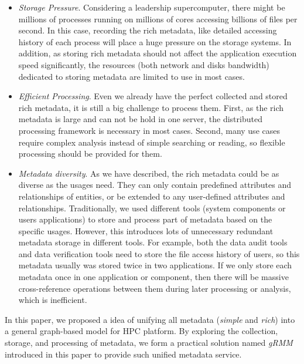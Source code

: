 \begin{itemize}

\item \textit{Storage Pressure}. Considering a leadership supercomputer, there might be millions of processes running on millions of cores accessing billions of files per second. In this case, recording the rich metadata, like detailed accessing history of each process will place a huge pressure on the storage systems. In addition, as storing rich metadata should not affect the application execution speed significantly, the resources (both network and disks bandwidth) dedicated to storing metadata are limited to use in most cases.

\item \textit{Efficient Processing}. Even we already have the perfect collected and stored rich metadata, it is still a big challenge to process them. First, as the rich metadata is large and can not be hold in one server, the distributed processing framework is necessary in most cases. Second, many use cases require complex analysis instead of simple searching or reading, so flexible processing should be provided for them.

\item \textit{Metadata diversity}. As we have described, the rich metadata could be as diverse as the usages need. They can only contain predefined attributes and relationships of entities, or be extended to any user-defined attributes and relationships. Traditionally, we used different tools (system components or users applications) to store and process part of metadata based on the specific usages. However, this introduces lots of unnecessary redundant metadata storage in different tools. For example, both the data audit tools and data verification tools need to store the file access history of users, so this metadata usually was stored twice in two applications. If we only store each metadata once in one application or component, then there will be massive cross-reference operations between them during later processing or analysis, which is inefficient.

\end{itemize}

In this paper, we proposed a idea of unifying all metadata (\textit{simple} and \textit{rich}) into a general graph-based model for HPC platform. By exploring the collection, storage, and processing of metadata, we form a practical solution named \textit{gRMM} introduced in this paper to provide such unified metadata service. 

